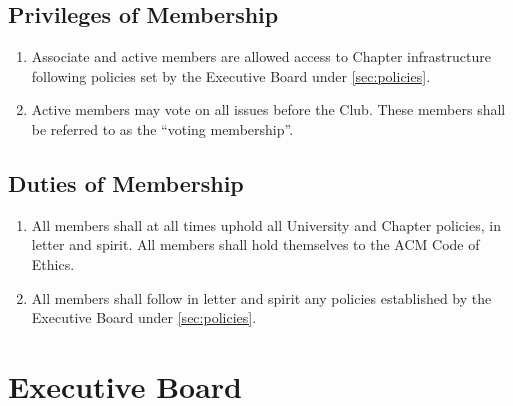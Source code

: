 \documentclass[12pt, letterpaper, oneside]{book}
\begin{document}
\section{Privileges of Membership}
\begin{enumerate}
    \item Associate and active members are allowed access to Chapter
        infrastructure following policies set by the Executive Board under
        \cref{sec:policies}.
    \item Active members may vote on all issues before the Club. These members
        shall be referred to as the ``voting membership''.
\end{enumerate}

\section{Duties of Membership}
\begin{enumerate}
    \item All members shall at all times uphold all University and Chapter
        policies, in letter and spirit. All members shall hold themselves to the
        ACM Code of Ethics.
    \item All members shall follow in letter and spirit any policies established
        by the Executive Board under \cref{sec:policies}.
\end{enumerate}

\chapter{Executive Board}
\end{document}
